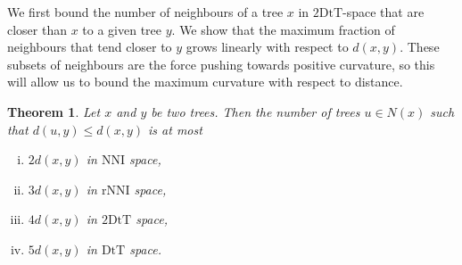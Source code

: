 \documentclass{amsart}
\newtheorem{theorem}[lemma]{Theorem}
\newcommand{\dts}{\mathrm{2DtT}}
\newcommand{\nni}{\mathrm{NNI}}
\newcommand{\rnni}{\mathrm{rNNI}}
\newcommand{\mdts}{\mathrm{DtT}}
\begin{document}
We first bound the number of neighbours of a tree $x$ in $\dts$-space that are closer than $x$ to a given tree $y$.
We show that the maximum fraction of neighbours that tend closer to $y$ grows linearly with respect to $d(x,y)$.
These subsets of neighbours are the force pushing towards positive curvature, so this will allow us to bound the maximum curvature with respect to distance.

\begin{theorem}
\label{max_good_neighbours}
Let $x$ and $y$ be two trees.
Then the number of trees $u \in N(x)$ such that $d(u, y) \le d(x, y)$ is at most
\begin{enumerate}[(i)]
\item $2d(x,y)$ in $\nni$ space,
\item $3d(x,y)$ in $\rnni$ space,
\item $4d(x,y)$ in $\dts$ space,
\item $5d(x,y)$ in $\mdts$ space.
\end{enumerate}
\end{theorem}
\end{document}
